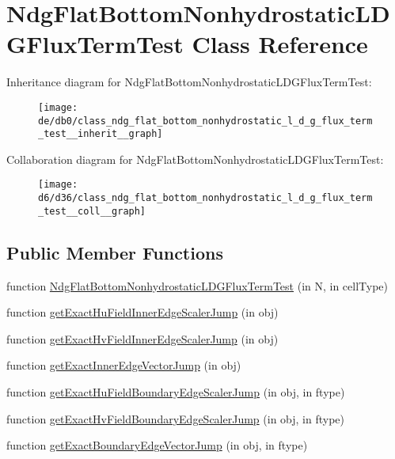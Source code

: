 \hypertarget{class_ndg_flat_bottom_nonhydrostatic_l_d_g_flux_term_test}{}\section{Ndg\+Flat\+Bottom\+Nonhydrostatic\+L\+D\+G\+Flux\+Term\+Test Class Reference}
\label{class_ndg_flat_bottom_nonhydrostatic_l_d_g_flux_term_test}


Inheritance diagram for Ndg\+Flat\+Bottom\+Nonhydrostatic\+L\+D\+G\+Flux\+Term\+Test\+:
\nopagebreak
\begin{figure}[H]
\begin{center}
\leavevmode
\texttt{[image: de/db0/class\_ndg\_flat\_bottom\_nonhydrostatic\_l\_d\_g\_flux\_term\_test\_\_inherit\_\_graph]}
\end{center}
\end{figure}


Collaboration diagram for Ndg\+Flat\+Bottom\+Nonhydrostatic\+L\+D\+G\+Flux\+Term\+Test\+:
\nopagebreak
\begin{figure}[H]
\begin{center}
\leavevmode
\texttt{[image: d6/d36/class\_ndg\_flat\_bottom\_nonhydrostatic\_l\_d\_g\_flux\_term\_test\_\_coll\_\_graph]}
\end{center}
\end{figure}
\subsection*{Public Member Functions}
\begin{DoxyCompactItemize}
\item 
function \hyperlink{class_ndg_flat_bottom_nonhydrostatic_l_d_g_flux_term_test_a71eeafd765b199ab1119e9bca1ed541b}{Ndg\+Flat\+Bottom\+Nonhydrostatic\+L\+D\+G\+Flux\+Term\+Test} (in N, in cell\+Type)
\item 
function \hyperlink{class_ndg_flat_bottom_nonhydrostatic_l_d_g_flux_term_test_ab4b09bdabb3fbf7a110734c32927ab49}{get\+Exact\+Hu\+Field\+Inner\+Edge\+Scaler\+Jump} (in obj)
\item 
function \hyperlink{class_ndg_flat_bottom_nonhydrostatic_l_d_g_flux_term_test_ab585b1677c7b4620ef533ffada8728d6}{get\+Exact\+Hv\+Field\+Inner\+Edge\+Scaler\+Jump} (in obj)
\item 
function \hyperlink{class_ndg_flat_bottom_nonhydrostatic_l_d_g_flux_term_test_ac695d43e03819e79bbcc0d31a78832a8}{get\+Exact\+Inner\+Edge\+Vector\+Jump} (in obj)
\item 
function \hyperlink{class_ndg_flat_bottom_nonhydrostatic_l_d_g_flux_term_test_a67f6cfcc65bc302477056b0a96a93993}{get\+Exact\+Hu\+Field\+Boundary\+Edge\+Scaler\+Jump} (in obj, in ftype)
\item 
function \hyperlink{class_ndg_flat_bottom_nonhydrostatic_l_d_g_flux_term_test_a9f8c70295a72d0f1e76252a05a096198}{get\+Exact\+Hv\+Field\+Boundary\+Edge\+Scaler\+Jump} (in obj, in ftype)
\item 
function \hyperlink{class_ndg_flat_bottom_nonhydrostatic_l_d_g_flux_term_test_a322e0237b3b5eb63a66e1c66b0f5bbf8}{get\+Exact\+Boundary\+Edge\+Vector\+Jump} (in obj, in ftype)
\end{DoxyCompactItemize}
